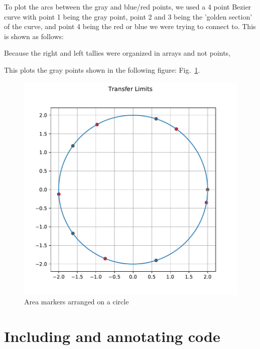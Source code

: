 \documentclass[12pt]{report}
\begin{document}
\singlespacing

\doublespacing

To plot the arcs between the gray and blue/red points, we used a 4 point Bezier curve with point 1
being the gray point, point 2 and 3 being the 'golden section' of the curve, and point 4 being the
red or blue we were trying to connect to. This is shown as follows:

\singlespacing

\doublespacing


Because the right and left tallies were organized in arrays and not points,

This plots the gray points shown in the following figure: Fig.~\ref{fig:AreaMarkers}.

\begin{figure}%
  \centering %
  \includegraphics[scale=1.0, page=1]{visuals/Plots1}
  \caption[Area markers] {Area markers arranged on a circle} %
  \label{fig:AreaMarkers}
\end{figure}

\clearpage

\section{Including and annotating code}
\label{sec:code}
\end{document}
